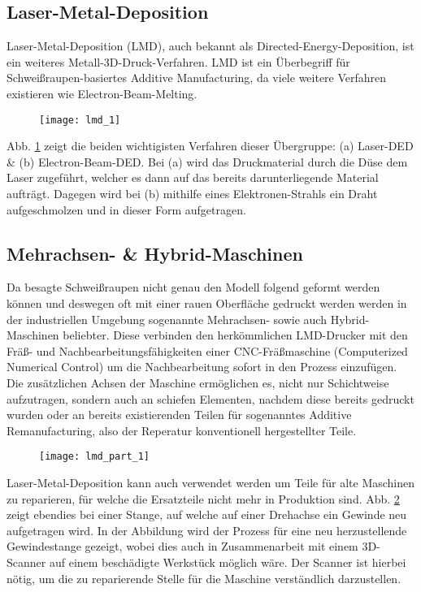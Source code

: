 \documentclass[../main.tex]{subfiles}
\begin{document}
\subsection{Laser-Metal-Deposition}
Laser-Metal-Deposition (LMD), auch bekannt als Directed-Energy-Deposition, ist ein weiteres Metall-3D-Druck-Verfahren. LMD ist ein Überbegriff für Schweißraupen-basiertes Additive Manufacturing, da viele weitere Verfahren existieren wie Electron-Beam-Melting.
\begin{figure}[h]
	\begin{center}

		\texttt{[image: lmd\_1]}
\label{img:lmd_1}	
	\end{center}
\end{figure}
Abb. \ref{img:lmd_1} zeigt die beiden wichtigisten Verfahren dieser Übergruppe: (a) Laser-DED \& (b) Electron-Beam-DED.
Bei (a) wird das Druckmaterial durch die Düse dem Laser zugeführt, welcher es dann auf das bereits darunterliegende Material aufträgt. 
Dagegen wird bei (b) mithilfe eines Elektronen-Strahls ein Draht aufgeschmolzen und in dieser Form aufgetragen. \parencite{ALL3D_1}
\subsection{Mehrachsen- \& Hybrid-Maschinen}
Da besagte Schweißraupen nicht genau den Modell folgend geformt werden können und deswegen oft mit einer rauen Oberfläche gedruckt werden werden in der industriellen Umgebung sogenannte Mehrachsen- sowie auch Hybrid-Maschinen beliebter. Diese verbinden den herkömmlichen LMD-Drucker mit den Fräß- und Nachbearbeitungsfähigkeiten einer CNC-Fräßmaschine (Computerized Numerical Control) um die Nachbearbeitung sofort in den Prozess einzufügen.
Die zusätzlichen Achsen der Maschine ermöglichen es, nicht nur Schichtweise aufzutragen, sondern auch an schiefen Elementen, nachdem diese bereits gedruckt wurden oder an bereits existierenden Teilen für sogenanntes Additive Remanufacturing, also der Reperatur konventionell hergestellter Teile. \parencite{ALL3D_2}
\begin{figure}[h]
	\begin{center}
	\texttt{[image: lmd\_part\_1]}	
		\label{img:lmd_part_1}
	\end{center}
	
\end{figure}

Laser-Metal-Deposition kann auch verwendet werden um Teile für alte Maschinen zu reparieren, für welche die Ersatzteile nicht mehr in Produktion sind.
Abb. \ref{img:lmd_part_1} zeigt ebendies bei einer Stange, auf welche auf einer Drehachse ein Gewinde neu aufgetragen wird. In der Abbildung wird der Prozess für eine neu herzustellende Gewindestange gezeigt, wobei dies auch in Zusammenarbeit mit einem 3D-Scanner auf einem beschädigte Werkstück möglich wäre. Der Scanner ist hierbei nötig, um die zu reparierende Stelle für die Maschine verständlich darzustellen.
\end{document}
